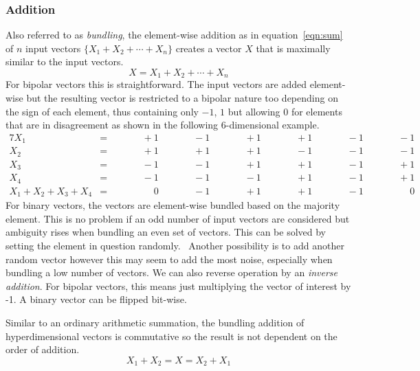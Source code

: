 \subsubsection{Addition} \label{sssec:add}
Also referred to as \textit{bundling}, the element-wise addition as in equation~\ref{eqn:sum} of $n$ input vectors $\{X_{1} + X_{2} + \cdots + X_{n}\}$ creates a vector $X$ that is maximally similar to the input vectors.
\begin{equation}
    \label{eqn:sum}
    X = X_{1} + X_{2} + \cdots + X_{n}
\end{equation}
For bipolar vectors this is straightforward. The input vectors are added element-wise but the resulting vector is restricted to a bipolar nature too depending on the sign of each element, thus containing only $-1$, $1$ but allowing $0$ for elements that are in disagreement as shown in the following $6$-dimensional example.
\begin{alignat*}{7}
    X_{1} &= && \qquad +1 && \qquad -1 && \qquad +1 && \qquad +1 && \qquad -1 && \qquad -1 \\
    X_{2} &= && \qquad +1 && \qquad +1 && \qquad +1 && \qquad -1 && \qquad -1 && \qquad -1 \\
    X_{3} &= && \qquad -1 && \qquad -1 && \qquad +1 && \qquad +1 && \qquad -1 && \qquad +1 \\
    X_{4} &= && \qquad -1 && \qquad -1 && \qquad -1 && \qquad +1 && \qquad -1 && \qquad +1 \\
    \hline
    X_{1} + X_{2} + X_{3} + X_{4} &= && \qquad \phantom{-}0 && \qquad -1 && \qquad +1 && \qquad +1 && \qquad -1 && \qquad \phantom{-}0
\end{alignat*}
For binary vectors, the vectors are element-wise bundled based on the majority element. This is no problem if an odd number of input vectors are considered but ambiguity rises when bundling an even set of vectors. This can be solved by setting the element in question randomly.~\cite{binBund} Another possibility is to add another random vector however this may seem to add the most noise, especially when bundling a low number of vectors. We can also reverse operation by an \textit{inverse addition}. For bipolar vectors, this means just multiplying the vector of interest by -1. A binary vector can be flipped bit-wise.

Similar to an ordinary arithmetic summation, the bundling addition of hyperdimensional vectors is commutative so the result is not dependent on the order of addition.
\begin{equation}
    \label{eqn:sumcom}
    X_{1} + X_{2} = X = X_{2} + X_{1}
\end{equation}
